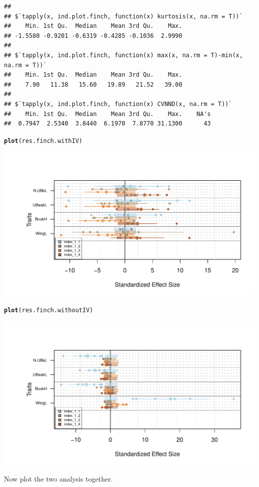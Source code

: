 \documentclass[12pt]{article}\usepackage[]{graphicx}\usepackage[]{color}
\makeatletter
\def\maxwidth{ %
  \ifdim\Gin@nat@width>\linewidth
    \linewidth
  \else
    \Gin@nat@width
  \fi
}
\newcommand{\hlstd}[1]{\textcolor[rgb]{0.345,0.345,0.345}{#1}}%
\newcommand{\hlkwd}[1]{\textcolor[rgb]{0.737,0.353,0.396}{\textbf{#1}}}%
\newenvironment{kframe}{%
 \def\at@end@of@kframe{}%
 \ifinner\ifhmode%
  \def\at@end@of@kframe{\end{minipage}}%
  \begin{minipage}{\columnwidth}%
 \fi\fi%
 \def\FrameCommand##1{\hskip\@totalleftmargin \hskip-\fboxsep
 \colorbox{shadecolor}{##1}\hskip-\fboxsep
     \hskip-\linewidth \hskip-\@totalleftmargin \hskip\columnwidth}%
 \MakeFramed {\advance\hsize-\width
   \@totalleftmargin\z@ \linewidth\hsize
   \@setminipage}}%
 {\par\unskip\endMakeFramed%
 \at@end@of@kframe}
\newenvironment{knitrout}{}{} %
\makeatother
\begin{document}
\begin{knitrout}
\begin{kframe}
\begin{verbatim}
## 
## $`tapply(x, ind.plot.finch, function(x) kurtosis(x, na.rm = T))`
##    Min. 1st Qu.  Median    Mean 3rd Qu.    Max. 
## -1.5580 -0.9201 -0.6319 -0.4285 -0.1036  2.9990 
## 
## $`tapply(x, ind.plot.finch, function(x) max(x, na.rm = T)-min(x, na.rm = T))`
##    Min. 1st Qu.  Median    Mean 3rd Qu.    Max. 
##    7.90   11.38   15.60   19.89   21.52   39.00 
## 
## $`tapply(x, ind.plot.finch, function(x) CVNND(x, na.rm = T))`
##    Min. 1st Qu.  Median    Mean 3rd Qu.    Max.    NA's 
##  0.7947  2.5340  3.8440  6.1970  7.8770 31.1300      43
\end{verbatim}
\begin{alltt}
\hlkwd{plot}\hlstd{(res.finch.withIV)}
\end{alltt}
\end{kframe}

{\centering \includegraphics[width=\maxwidth]{figure/unnamed-chunk-47-1} 

}


\begin{kframe}\begin{alltt}
\hlkwd{plot}\hlstd{(res.finch.withoutIV)}
\end{alltt}
\end{kframe}

{\centering \includegraphics[width=\maxwidth]{figure/unnamed-chunk-47-2} 

}



\end{knitrout}
Now plot the two analysis together.
\end{document}

